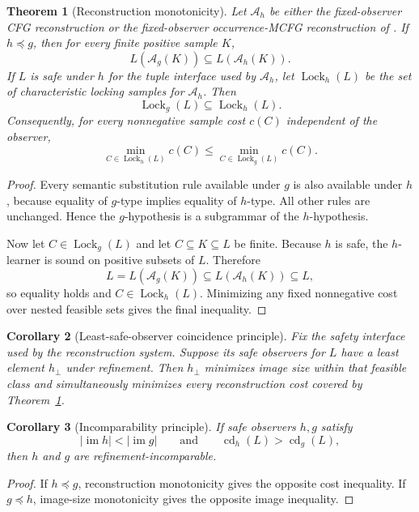 \documentclass[11pt]{article}
\newtheorem{theorem}{Theorem}[section]
\newtheorem{corollary}[theorem]{Corollary}
\theoremstyle{definition}
\theoremstyle{remark}
\newcommand{\im}{\operatorname{im}}
\newcommand{\cd}{\operatorname{cd}}
\newcommand{\Lock}{\operatorname{Lock}}
\begin{document}
\begin{theorem}[Reconstruction monotonicity]
\label{thm:reconstruction-monotonicity}
Let $\mathcal A_h$ be either the fixed-observer CFG reconstruction or the
fixed-observer occurrence-MCFG reconstruction of \cite{KuriyamaOFET}.  If
$h\preceq g$, then for every finite positive sample $K$,
\[
 L(\mathcal A_g(K))\subseteq L(\mathcal A_h(K)).
\]
If $L$ is safe under $h$ for the tuple interface used by $\mathcal A_h$,
let $\Lock_h(L)$ be the set of characteristic locking samples for
$\mathcal A_h$.  Then
\[
 \boxed{\Lock_g(L)\subseteq\Lock_h(L).}
\]
Consequently, for every nonnegative sample cost $c(C)$ independent of the
observer,
\[
 \min_{C\in\Lock_h(L)}c(C)
 \le
 \min_{C\in\Lock_g(L)}c(C).
\]
\end{theorem}

\begin{proof}
Every semantic substitution rule available under $g$ is also available under
$h$, because equality of $g$-type implies equality of $h$-type.  All other
rules are unchanged.  Hence the $g$-hypothesis is a subgrammar of the
$h$-hypothesis.

Now let $C\in\Lock_g(L)$ and let $C\subseteq K\subseteq L$ be finite.
Because $h$ is safe, the $h$-learner is sound on positive subsets of $L$.
Therefore
\[
 L=L(\mathcal A_g(K))
 \subseteq L(\mathcal A_h(K))
 \subseteq L,
\]
so equality holds and $C\in\Lock_h(L)$.  Minimizing any fixed nonnegative
cost over nested feasible sets gives the final inequality.
\end{proof}

\begin{corollary}[Least-safe-observer coincidence principle]
\label{cor:least-safe}
Fix the safety interface used by the reconstruction system.  Suppose its
safe observers for $L$ have a least element $h_\bot$ under refinement.  Then
$h_\bot$ minimizes image size within that feasible class and simultaneously
minimizes every reconstruction cost covered by
Theorem~\ref{thm:reconstruction-monotonicity}.
\end{corollary}

\begin{corollary}[Incomparability principle]
\label{cor:incomparability}
If safe observers $h,g$ satisfy
\[
 |\im h|<|\im g|
 \qquad\text{and}\qquad
 \cd_h(L)>\cd_g(L),
\]
then $h$ and $g$ are refinement-incomparable.
\end{corollary}

\begin{proof}
If $h\preceq g$, reconstruction monotonicity gives the opposite cost
inequality.  If $g\preceq h$, image-size monotonicity gives the opposite image
inequality.
\end{proof}
\end{document}
